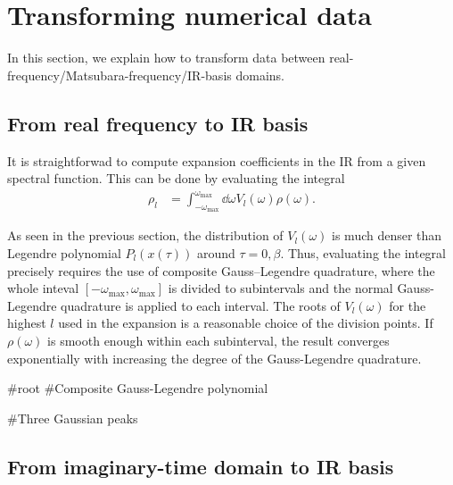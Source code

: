\documentclass[submission, LectureNotes]{SciPost}
\newcommand{\wmax}{\ensuremath{{\omega_\mathrm{max}}}}
\begin{document}
%

\clearpage
\section{Transforming numerical data}
In this section,
we explain how to transform data between real-frequency/Matsubara-frequency/IR-basis domains.

\subsection{From real frequency to IR basis}
It is straightforwad to compute expansion coefficients in the IR 
from a given spectral function.
This can be done by evaluating the integral
\begin{align}
    \rho_l &= \int_{-\wmax}^\wmax \dd \omega V_l(\omega) \rho(\omega).
\end{align}

As seen in the previous section,
the distribution of $V_l(\omega)$ is much denser than Legendre polynomial $P_l(x(\tau))$ around $\tau=0, \beta$.
Thus, evaluating the integral precisely requires the use of composite Gauss–Legendre quadrature,
where the whole inteval $[-\wmax, \wmax]$ is divided to subintervals and the normal Gauss-Legendre quadrature is 
applied to each interval.
The roots of $V_l(\omega)$ for the highest $l$ used in the expansion
is a reasonable choice of the division points.
If $\rho(\omega)$ is smooth enough within each subinterval,
the result converges exponentially with increasing the degree of the Gauss-Legendre quadrature.

\begin{python}
#root
#Composite Gauss-Legendre polynomial
\end{python}

\begin{python}
#Three Gaussian peaks
\end{python}

\subsection{From imaginary-time domain to IR basis}
\end{document}
